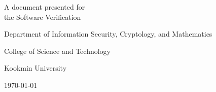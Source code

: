\begin{titlepage}
\begin{center}
{}
\end{center}
	
	\vspace{1.5cm}
    \vfill
    A document presented for\\
    the Software Verification
    
    \vspace{0.8cm}
    {\large\textsf{Department of Information Security, Cryptology, and Mathematics}\par}
    {\large\textsf{College of Science and Technology}\par}
    {\large\textsf{Kookmin University}\par}
    \vspace{.25in}
    {\large \textsf{\today}\par}
    
\end{titlepage}


